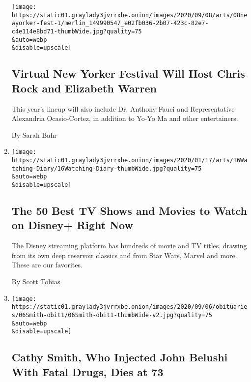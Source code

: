 \begin{enumerate}
  \texttt{[image: https://static01.graylady3jvrrxbe.onion/images/2020/09/08/arts/08newyorker-fest-1/merlin\_149990547\_e02fb036-2b07-423c-82e7-c4e114e8bd71-thumbWide.jpg?quality=75\\\&auto=webp\\\&disable=upscale]}

  \hypertarget{virtual-new-yorker-festival-will-host-chris-rock-and-elizabeth-warren}{%
  \subsection{Virtual New Yorker Festival Will Host Chris Rock and
  Elizabeth
  Warren}\label{virtual-new-yorker-festival-will-host-chris-rock-and-elizabeth-warren}}

  This year's lineup will also include Dr. Anthony Fauci and
  Representative Alexandria Ocasio-Cortez, in addition to Yo-Yo Ma and
  other entertainers.

  By Sarah Bahr
\item
  \href{/article/best-tv-shows-movies-disney-plus.html}{}

  \texttt{[image: https://static01.graylady3jvrrxbe.onion/images/2020/01/17/arts/16Watching-Diary/16Watching-Diary-thumbWide.jpg?quality=75\\\&auto=webp\\\&disable=upscale]}

  \hypertarget{the-50-best-tv-shows-and-movies-to-watch-on-disney-right-now}{%
  \subsection{The 50 Best TV Shows and Movies to Watch on Disney+ Right
  Now}\label{the-50-best-tv-shows-and-movies-to-watch-on-disney-right-now}}

  The Disney streaming platform has hundreds of movie and TV titles,
  drawing from its own deep reservoir classics and from Star Wars,
  Marvel and more. These are our favorites.

  By Scott Tobias
\item
  \href{/2020/09/04/us/cathy-smith-dead.html}{}

  \texttt{[image: https://static01.graylady3jvrrxbe.onion/images/2020/09/06/obituaries/06Smith-obit1/06Smith-obit1-thumbWide-v2.jpg?quality=75\\\&auto=webp\\\&disable=upscale]}

  \hypertarget{cathy-smith-who-injected-john-belushi-with-fatal-drugs-dies-at-73}{%
  \subsection{Cathy Smith, Who Injected John Belushi With Fatal Drugs,
  Dies at
  73}\label{cathy-smith-who-injected-john-belushi-with-fatal-drugs-dies-at-73}}


\end{enumerate}
